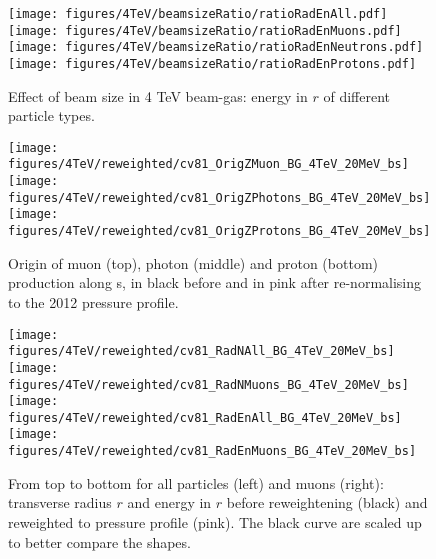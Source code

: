 \begin{figure}%
\begin{center}
  \texttt{[image: figures/4TeV/beamsizeRatio/ratioRadEnAll.pdf]}
  \texttt{[image: figures/4TeV/beamsizeRatio/ratioRadEnMuons.pdf]}
  \texttt{[image: figures/4TeV/beamsizeRatio/ratioRadEnNeutrons.pdf]}
  \texttt{[image: figures/4TeV/beamsizeRatio/ratioRadEnProtons.pdf]}
\end{center}
\vspace{-0.6cm}
 \caption{Effect of beam size in 4 TeV beam-gas: energy in $r$ of different particle types.
  \label{bsRatioRadEn}}
\end{figure}


\newpage



\begin{figure}
\begin{center}
  \texttt{[image: figures/4TeV/reweighted/cv81\_OrigZMuon\_BG\_4TeV\_20MeV\_bs]}
  \texttt{[image: figures/4TeV/reweighted/cv81\_OrigZPhotons\_BG\_4TeV\_20MeV\_bs]}
  \texttt{[image: figures/4TeV/reweighted/cv81\_OrigZProtons\_BG\_4TeV\_20MeV\_bs]}
\end{center}
\vspace{-0.6cm}
 \caption{Origin of muon (top), photon (middle) and proton (bottom) production along s, in black before and in pink after re-normalising to the 2012 pressure profile. 
  \label{fig:OrigZ4TeV2}}
\end{figure}

\begin{figure}
\begin{center}
  \texttt{[image: figures/4TeV/reweighted/cv81\_RadNAll\_BG\_4TeV\_20MeV\_bs]}
  \texttt{[image: figures/4TeV/reweighted/cv81\_RadNMuons\_BG\_4TeV\_20MeV\_bs]}
  \texttt{[image: figures/4TeV/reweighted/cv81\_RadEnAll\_BG\_4TeV\_20MeV\_bs]}
  \texttt{[image: figures/4TeV/reweighted/cv81\_RadEnMuons\_BG\_4TeV\_20MeV\_bs]}
\end{center}
\vspace{-0.6cm}
 \caption{From top to bottom for all particles (left) and muons (right): transverse radius $r$ and energy in $r$ before reweightening (black) and reweighted to pressure profile (pink). The black curve are scaled up to better compare the shapes. 
  \label{fig:cv81EkinPhiEn4TeV2}} 
\end{figure}


